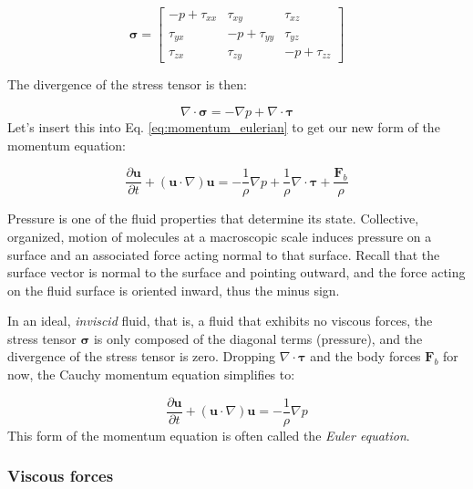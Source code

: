 \documentclass[12pt]{article}
\numberwithin{equation}{section}
\numberwithin{figure}{section}
\numberwithin{table}{section}
\begin{document}
\begin{equation}
  \boldsymbol{\sigma} = \begin{bmatrix}
    -p + \tau_{xx} & \tau_{xy} & \tau_{xz} \\
    \tau_{yx} & -p + \tau_{yy} & \tau_{yz} \\
    \tau_{zx} & \tau_{zy} & -p + \tau_{zz}
  \end{bmatrix}
\end{equation}

The divergence of the stress tensor is then:

\begin{equation}
  \nabla \cdot \boldsymbol{\sigma} = - \nabla p + \nabla \cdot \boldsymbol{\tau}
\end{equation}
Let's insert this into Eq. \ref{eq:momentum_eulerian} to get our new form of
the momentum equation:

\begin{equation}
  \frac{\partial \mathbf{u}}{\partial t} + (\mathbf{u} \cdot \nabla) \mathbf{u} =
  - \frac{1}{\rho} \nabla p + \frac{1}{\rho} \nabla \cdot \boldsymbol{\tau} + \frac{\mathbf{F}_b}{\rho}
  \label{eq:momentum_cauchy_with_shear}
\end{equation}

Pressure is one of the fluid properties that determine its state.
Collective, organized, motion of molecules at a macroscopic scale induces
pressure on a surface and an associated force acting normal to that surface.
Recall that the surface vector is normal to the surface and pointing outward,
and the force acting on the fluid surface is oriented inward, thus the minus sign.

In an ideal, \textit{inviscid} fluid, that is, a fluid that exhibits no viscous
forces, the stress tensor $\boldsymbol{\sigma}$ is only composed of the diagonal
terms (pressure), and the divergence of the stress tensor is zero.
Dropping $\nabla \cdot \boldsymbol{\tau}$ and the body forces $\mathbf{F}_b$ for
now, the Cauchy momentum equation simplifies to:

\begin{equation}
  \frac{\partial \mathbf{u}}{\partial t} + (\mathbf{u} \cdot \nabla) \mathbf{u} =
  - \frac{1}{\rho} \nabla p
  \label{eq:momentum_euler}
\end{equation}
This form of the momentum equation is often called the \textit{Euler equation}.

\subsubsection{Viscous forces}
\end{document}
